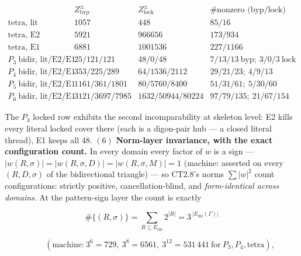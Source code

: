 \begin{theorem}
\[
\begin{array}{l|ccc}
& Z^{\pm}_{\mathrm{byp}} & Z^{\pm}_{\mathrm{lock}} & \#\text{nonzero (byp/lock)}\\
\hline
\text{tetra, lit} & 1057 & 448 & 85/16\\
\text{tetra, E2} & 5921 & 966656 & 173/934\\
\text{tetra, E1} & 6881 & 1001536 & 227/1166\\
\hline
P_3\ \text{bidir, lit/E2/E1} & 25/121/121 & 48/0/48 & 7/13/13\ \text{byp};\ 3/0/3\ \text{lock}\\
P_4\ \text{bidir, lit/E2/E1} & 353/225/289 & 64/1536/2112 & 29/21/23;\ 4/9/13\\
P_5\ \text{bidir, lit/E2/E1} & 1161/361/1801 & 80/5760/8400 & 51/31/61;\ 5/30/60\\
P_6\ \text{bidir, lit/E2/E1} & 3121/3697/7985 & 1632/50944/80224 & 97/79/135;\ 21/67/154
\end{array}
\]

The $P_3$ locked row exhibits the second incomparability at skeleton level: E2 kills every literal locked cover there (each is a digon-pair hub — a closed literal thread), E1 keeps all $48$. $(6)$ \textbf{Norm-layer invariance, with the exact configuration count.} In every domain every factor of $w$ is a sign — $|w(R,\sigma)|=|w(R,\sigma,D)|=|w(R,\sigma,M)|=1$ (machine: asserted on every $(R,D,\sigma)$ of the bidirectional triangle) — so CT2.8's norms $\sum|w|^2$ count configurations: strictly positive, cancellation-blind, and \textit{form-identical across domains}. At the pattern-sign layer the count is exactly

\[
\#\{(R,\sigma)\}=\sum_{R\subseteq E_{\mathrm{dir}}}2^{|R|}=3^{\,|E_{\mathrm{dir}}(\Gamma)|}
\]

\[
\qquad (\text{machine:}\ 3^6=729,\ 3^8=6561,\ 3^{12}=531\,441\ \text{for}\ P_3,P_4,\text{tetra}),
\]


\end{theorem}
